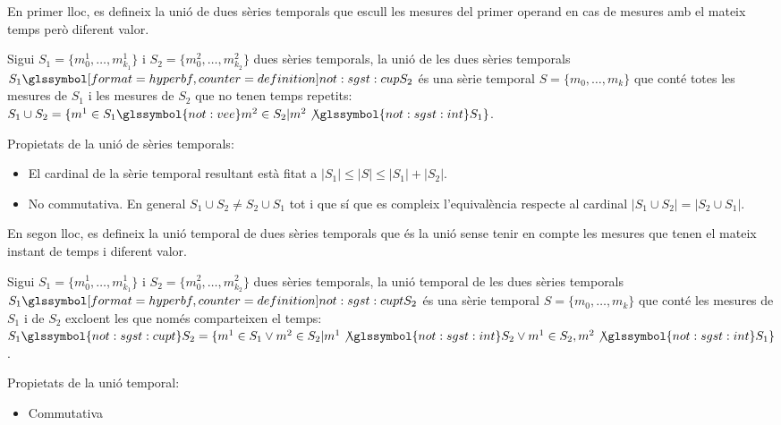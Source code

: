 En primer lloc, es defineix la unió de dues sèries temporals que
escull les mesures del primer operand en cas de mesures amb el mateix
temps però diferent valor.
\begin{definition}[unió]
  Sigui $S_1=\{m_0^1, \dotsc, m_{k_1}^1\}$ i $S_2=\{m_0^2, \dotsc,
  m_{k_2}^2\}$ dues sèries temporals, la unió de les dues sèries
  temporals $S_1 \glssymboldef{not:sgst:cup} S_2$ és una sèrie
  temporal $S=\{m_0, \dotsc, m_k\}$ que conté totes les mesures de
  $S_1$ i les mesures de $S_2$ que no tenen temps repetits: $S_1 \cup
  S_2 = \{m^1 \in S_1 \glssymbol{not:vee} m^2 \in S_2 | m^2
  \not\glssymbol{not:sgst:int} S_1 \}$.
\end{definition}

Propietats de la unió de sèries temporals:
\begin{itemize}
\item El cardinal de la sèrie temporal resultant està fitat a
  $|S_1| \leq |S| \leq |S_1| + |S_2|$. 
\item No commutativa. En general
  $S_1\cup S_2 \neq S_2\cup S_1$ tot i que sí que es compleix
  l'equivalència respecte al cardinal $|S_1 \cup S_2| = |S_2\cup S_1|$.
\end{itemize}

En segon lloc, es defineix la unió temporal de dues sèries temporals
que és la unió sense tenir en compte les mesures que tenen el mateix
instant de temps i diferent valor.
\begin{definition}
  Sigui $S_1=\{m_0^1, \dotsc, m_{k_1}^1\}$ i $S_2=\{m_0^2, \dotsc,
  m_{k_2}^2\}$ dues sèries temporals, la unió temporal de les dues
  sèries temporals $S_1 \glssymboldef{not:sgst:cupt} S_2$ és una sèrie
  temporal $S=\{m_0, \dotsc, m_k\}$ que conté les mesures de $S_1$ i
  de $S_2$ excloent les que només comparteixen el temps: $S_1
  \glssymbol{not:sgst:cupt} S_2 = \{ m^1 \in S_1 \vee m^2 \in S_2 |
  m^1 \not\glssymbol{not:sgst:int} S_2 \vee m^1 \in S_2, m^2
  \not\glssymbol{not:sgst:int} S_1 \}$.
\end{definition}


Propietats de la unió temporal:
\begin{itemize}
\item Commutativa
\end{itemize}




